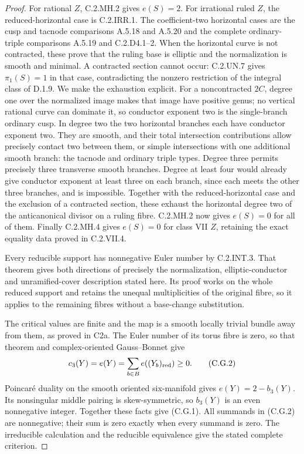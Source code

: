 \begin{proof}
For rational $Z$, C.2.MH.2 gives $e(S)=2$. For irrational
ruled $Z$, the reduced-horizontal case is C.2.IRR.1. The
coefficient-two horizontal cases are the cusp and tacnode
comparisons A.5.18 and A.5.20 and the complete ordinary-triple
comparisons A.5.19 and C.2.D4.1--2. When the horizontal curve
is not contracted, these prove that the ruling base is
elliptic and the normalization is smooth and minimal.
A contracted section cannot occur: C.2.UN.7 gives
$\pi_1(S)=1$ in that case, contradicting the nonzero
restriction of the integral class of D.1.9.
We make the exhaustion explicit. For a noncontracted $2C$,
degree one over the normalized image makes that image have
positive genus; no vertical rational curve can dominate it,
so conductor exponent two is the single-branch ordinary
cusp. In degree two the two horizontal branches each have
conductor exponent two. They are smooth, and their total
intersection contributions allow precisely contact two
between them, or simple intersections with one additional
smooth branch: the tacnode and ordinary triple types.
Degree three permits precisely three transverse smooth
branches. Degree at least four would already give
conductor exponent at least three on each branch, since
each meets the other three branches, and is impossible.
Together with the reduced-horizontal case and the exclusion
of a contracted section,
these exhaust the horizontal degree two of the
anticanonical divisor on a ruling fibre. C.2.MH.2 now gives
$e(S)=0$ for all of them. Finally C.2.MH.4 gives $e(S)=0$ for
class VII $Z$, retaining the exact equality data proved in
C.2.VII.4.

Every reducible support has nonnegative Euler number by
C.2.INT.3. That theorem gives both directions of precisely
the normalization, elliptic-conductor and unramified-cover
description stated here. Its proof works on the whole
reduced support and retains the unequal multiplicities of
the original fibre, so it applies to the remaining fibres
without a base-change substitution.

The critical values are finite and the map is a smooth
locally trivial bundle away from them, as proved in C2a.
The Euler number of its torus fibre is zero, so that theorem
and complex-oriented Gauss--Bonnet give
\[
                  c_3(Y)=e(Y)=\sum_{b\in B}e((Y_b)_{\rm red})\ge0.
                                                        \tag{C.G.2}
\]
Poincar\'e duality on the smooth oriented six-manifold gives
$e(Y)=2-b_3(Y)$. Its nonsingular middle pairing is
skew-symmetric, so $b_3(Y)$ is an even nonnegative integer.
Together these facts give (C.G.1). All summands in (C.G.2)
are nonnegative; their sum is zero exactly when every
summand is zero. The irreducible calculation and the
reducible equivalence give the stated complete criterion.
\end{proof}
